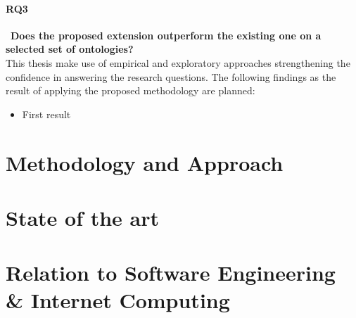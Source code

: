 \documentclass[12pt, notitlepage]{article}
\begin{document}
\paragraph{RQ3}~\textbf{Does the proposed extension outperform the existing one on a selected set of ontologies?}\\
This thesis make use of empirical and exploratory approaches strengthening the confidence in answering the research questions. The following findings as the result of applying the proposed methodology are planned:
\begin{itemize}
	\item First result
\end{itemize}
\section{Methodology and Approach}
\section{State of the art}
\section{Relation to Software Engineering \& Internet Computing}



\newpage


\end{document}
